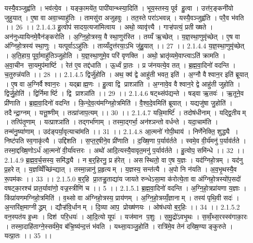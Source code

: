 यस्यै॒वञ्जुह्व॑ति । भव॑त्ये॒व । यङ्का॒मये॑त॒ पापी॑यान्थ्स्या॒दिति॑ । भूय॒स्तस्य॒ पूर्व॑ हु॒त्वा । उत्त॑र॒ङ्कनी॑यो जुहुयात् । ए॒षा वा अवा॒च्याहु॑तिः । तामसु॑रा अजुहवुः । तत॒स्ते परा॑ऽभवन्न् । यस्यै॒वञ्जुह्व॑ति । परै॒व भ॑वति ।। 26 ।।
2.1.4.3
हु॒त्वोप॑ सादय॒त्यजा॑मित्वाय । अथो॒ व्यावृ॑त्त्यै । गाऱ्ह॑पत्यं॒ प्रतीख्षते । अन॑नुध्यायिनमे॒वैन॑ङ्करोति । अ॒ग्नि॒हो॒त्रस्य॒ वै स्था॒णुर॑स्ति । तय्यँ ऋ॒च्छेत् । य॒ज्ञ॒स्था॒णुमृ॑च्छेत् । ए॒ष वा अ॑ग्निहो॒त्रस्य॑ स्था॒णुः । यत्पूर्वाऽऽहु॑तिः । ताय्यँदुत्त॑रया॒ऽभि जु॑हु॒यात् ।। 27 ।।
2.1.4.4
य॒ज्ञ॒स्था॒णुमृ॑च्छेत् । अ॒ति॒हाय॒ पूर्वा॒माहु॑तिञ्जुहोति । य॒ज्ञ॒स्था॒णुमे॒व परि॑ वृणक्ति । अथो॒ भ्रातृ॑व्यमे॒वाप्त्वाऽति॑ क्रामति । अ॒वा॒चीन॑ सा॒यमुप॑मार्ष्टि । रेत॑ ए॒व तद्द॑धाति । ऊ॒र्ध्वं प्रा॒तः । प्र ज॑नयत्ये॒व तत् । ब्र॒ह्म॒वा॒दिनो॑ वदन्ति । च॒तुरुन्न॑यति ।। 28 ।।
2.1.4.5
द्विर्जु॑होति । अथ॒ क्व॑ द्वे आहु॑ती भवत॒ इति॑ । अ॒ग्नौ वैश्वान॒र इति॑ ब्रूयात् । ए॒ष वा अ॒ग्निर्वैश्वान॒रः । यद्ब्राह्म॒णः । हु॒त्वा द्वि प्राश्ञा॑ति । अ॒ग्नावे॒व वैश्वान॒रे द्वे आहु॑ती जुहोति । द्विर्जु॒होति॑ । द्विर्निमार्ष्टि । द्वि प्राश्ञा॑ति ।। 29 ।।
2.1.4.6
षट्थ्संप॑द्यन्ते । षड्वा ऋ॒तवः॑ । ऋ॒तूने॒व प्री॑णाति । ब्र॒ह्म॒वा॒दिनो॑ वदन्ति । कि॒न्दे॒व॒त्य॑मग्निहो॒त्रमिति॑ । वै॒श्व॒दे॒वमिति॑ ब्रूयात् । यद्यजु॑षा जु॒होति॑ । तदैन्द्रा॒ग्नम् । यत्तू॒ष्णीम् । तत्प्रा॑जाप॒त्यम् ।। 30 ।।
2.1.4.7
यन्नि॒मार्ष्टि॑ । तदोष॑धीनाम् । यद्द्वि॒तीयम् । तत्पि॑तृ॒णाम् । यत्प्राश्ञा॑ति । तद्गर्भा॑णाम् । तस्मा॒द्गर्भा॒ अन॑श्ञन्तो वर्धन्ते । यदा॒चाम॑ति । तन्म॑नु॒ष्या॑णाम् । उद॑ङ्पर्या॒वृत्याचा॑मति ।। 31 ।।
2.1.4.8
आ॒त्मनो॑ गोपी॒थाय॑ । निर्णे॑नेक्ति॒ शुद्ध्यै । निष्ट॑पति स्व॒गाकृ॑त्यै । उद्दि॑शति । स॒प्त॒र्॒षीने॒व प्री॑णाति । द॒ख्षि॒णा प॒र्याव॑र्तते । स्वमे॒व वी॒र्य॑मनु॑ प॒र्याव॑र्तते । तस्मा॒द्दख्षि॒णोऽर्ध॑ आ॒त्मनो॑ वी॒र्या॑वत्तरः । अथो॑ आदि॒त्यस्यै॒वावृत॒मनु॑ प॒र्याव॑र्तते । हु॒त्वोप॒ समि॑न्धे ।। 32 ।।
2.1.4.9
ब्र॒ह्म॒व॒र्च॒सस्य॒ समि॑द्ध्यै । न ब॒र्॒हिरनु॒ प्र ह॑रेत् । अस॑स्थितो॒ वा ए॒ष य॒ज्ञः । यद॑ग्निहो॒त्रम् । यद॑नु प्र॒हरेत् । य॒ज्ञव्विँच्छि॑न्द्यात् । तस्मा॒न्नानु॑ प्र॒हृत्यम् । य॒ज्ञस्य॒ सन्त॑त्यै । अ॒पो नि न॑यति । अ॒व॒भृ॒थस्यै॒व रू॒पम॑कः ।। 33 ।।
2.1.5.0
ब॒र्॒हि प्रा॒तऱ्हु॒ताद्या॑य जायते रुन्धेऽसा॒मा क॑रोत्ये॒ता वा अ॑ग्निहो॒त्रस्यो॑प॒सदो॑ वषट्का॒रश्च॑ प्रात॒र्यावा॑णो॒ वज्र॒स्त्रीणि॑ च ।। 5 ।।
2.1.5.1
ब्र॒ह्म॒वा॒दिनो॑ वदन्ति । अ॒ग्नि॒हो॒त्रप्रा॑यणा य॒ज्ञाः । किंप्रा॑यणमग्निहो॒त्रमिति॑ । व॒थ्सो वा अ॑ग्निहो॒त्रस्य॒ प्राय॑णम् । अ॒ग्नि॒हो॒त्रय्यँ॒ज्ञानाम् । तस्य॑ पृथि॒वी सदः॑ । अ॒न्तरि॑क्ष॒माग्नीद्ध्रम् । द्यौऱ्ह॑वि॒र्धानम् । दि॒व्या आप॒ प्रोख्ष॑णयः । ओष॑धयो ब॒र्॒हिः ।। 34 ।।
2.1.5.2
वन॒स्पत॑य इ॒ध्मः । दिश॑ परि॒धयः॑ । आ॒दि॒त्यो यूपः॑ । यज॑मान प॒शुः । स॒मु॒द्रो॑ऽवभृ॒थः । स॒व्वँ॒थ्स॒रस्स्व॑गाका॒रः । तस्मा॒दाहि॑ताग्ने॒स्सर्व॑मे॒व ब॑ऱ्हि॒ष्य॑न्द॒त्तं भ॑वति । यथ्सा॒यञ्जु॒होति॑ । रात्रि॑मे॒व तेन॑ दख्षि॒ण्याङ्कुरुते । यत्प्रा॒तः ।। 35 ।।
